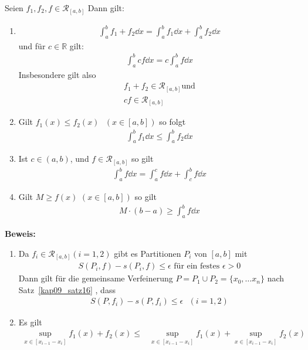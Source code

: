 \begin{Satz}{\label{vl_11_satz24}%
	Seien $f_1, f_2,f \in \mathcal{R}_{[a,b]}$ Dann gilt:
	\begin{enumerate}
		\item 
		\begin{align*}
			\int_a^b f_1 +f_2 \dd{x} = \int_a^b f_1\dd{x} + \int_a^b f_2 \dd{x}
		\end{align*}
		und für $c \in \mathbb{R}$ gilt:
		\begin{align*}
			\int_a^b c f\dd{x} = c \int_a^b f\dd{x}
		\end{align*}
		Insbesondere gilt also 
		\begin{align*}
			f_1 + f_2 \in \mathcal{R}_{[a,b]} \text{und} \\
			c f \in \mathcal{R}_{[a,b]}
		\end{align*}
		\item Gilt $f_1(x) \leq f_2(x) \text{ } ( x \in [a,b])$ so folgt
		\begin{align*}			
			\int_a^b f_1 \dd{x} \leq \int_a^b f_2 \dd{x}
		\end{align*}
		\item Ist $c \in (a,b)$, und $f \in \mathcal{R}_{[a,b]}$ so gilt
		\begin{align*}
			\int_a^b f\dd{x} = \int_a^c f\dd{x} + \int_c^b f \dd{x}
		\end{align*}
		\item Gilt $M \geq f(x)$ $(x \in [a,b])$ so gilt 
		\begin{align*}
			M \cdot (b-a) \geq \int_a^b f \dd{x}
		\end{align*}
	\end{enumerate}
	\textbf{Beweis:}
	\begin{enumerate}
		\item Da $f_i \in \mathcal{R}_{[a,b]} (i = 1, 2)$ gibt es Partitionen 
		$P_i$ von $[a,b]$ mit 
		\begin{align*}
			S(P_i,f) - s(P_i,f) \leq \epsilon \text{ für ein festes } \epsilon > 0
		\end{align*}
		Dann gilt für die gemeinsame Verfeinerung $P = P_1 \cup P_2 = \{x_0, \hdots
		x_n\}$ nach Satz~\ref{kap09_satz16}
		, dass 
		\begin{align*}
			S(P,f_i) - s(P, f_i) \leq \epsilon \text{ }(i = 1,2)
		\end{align*}		 
		\item Es gilt 
		\begin{align*}
			\sup_{x \in [x_{i-1}-x_i]} f_1(x) +f_2(x) \leq & 
			\sup_{x \in [x_{i-1}-x_i]} f_1(x) + \sup_{x \in [x_{i-1}-x_i]} f_2(x)

\end{align*}
\end{enumerate}}
\end{Satz}
